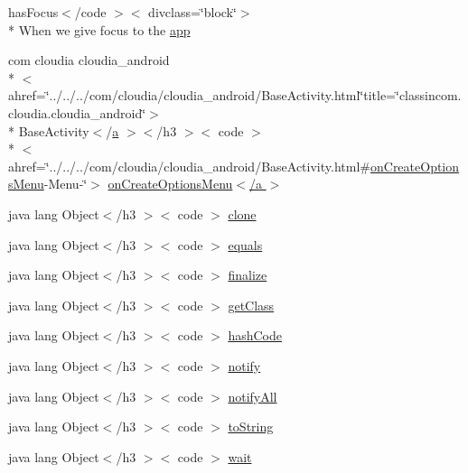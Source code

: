 \begin{DoxyCompactItemize}
\item 
has\-Focus$<$/code $>$$<$ divclass=\char`\"{}block\char`\"{}$>$\\*
 When we give focus to the \hyperlink{_cloudia_activity_8html_a788087bebea3161c6b9148d02d7652b0}{app}
\item 
com cloudia cloudia\-\_\-android\\*
$<$ ahref=\char`\"{}../../../com/cloudia/cloudia\-\_\-android/Base\-Activity.\-html\char`\"{}title=\char`\"{}classincom.\-cloudia.\-cloudia\-\_\-android\char`\"{}$>$\\*
 Base\-Activity$<$/\hyperlink{style_8css_a5e8981582017bb8b84c21f148345d1f7}{a} $>$$<$/h3 $>$$<$ code $>$\\*
$<$ ahref=\char`\"{}../../../com/cloudia/cloudia\-\_\-android/Base\-Activity.\-html\#\hyperlink{index-13_8html_a96b77eefe935dd33e8be2f1a26fcd2b6}{on\-Create\-Options\-Menu}-\/Menu-\/\char`\"{}$>$ \hyperlink{_cloudia_activity_8html_a624d351f7879c37d4dbd43acf019df6c}{on\-Create\-Options\-Menu$<$/a $>$}
\item 
java lang Object$<$/h3 $>$$<$ code $>$ \hyperlink{_cloudia_activity_8html_adc9607fcabf6f2d7f401ad52015ef6e0}{clone}
\item 
java lang Object$<$/h3 $>$$<$ code $>$ \hyperlink{_cloudia_activity_8html_a8974318cea585f72df717e0380ec7104}{equals}
\item 
java lang Object$<$/h3 $>$$<$ code $>$ \hyperlink{_cloudia_activity_8html_ab2315181ead4aeedef2374039b6ddde7}{finalize}
\item 
java lang Object$<$/h3 $>$$<$ code $>$ \hyperlink{_cloudia_activity_8html_a98e6644727fe65eac217a6855045be43}{get\-Class}
\item 
java lang Object$<$/h3 $>$$<$ code $>$ \hyperlink{_cloudia_activity_8html_a8e178e2bb2bef055ea23ea3910a221ca}{hash\-Code}
\item 
java lang Object$<$/h3 $>$$<$ code $>$ \hyperlink{_cloudia_activity_8html_ae99ae10b5010594dbda4794e02db271b}{notify}
\item 
java lang Object$<$/h3 $>$$<$ code $>$ \hyperlink{_cloudia_activity_8html_a1279357e6e09e33e75b55eb05fdb6436}{notify\-All}
\item 
java lang Object$<$/h3 $>$$<$ code $>$ \hyperlink{_cloudia_activity_8html_a36e8a76a4132c9a7081416f27d087615}{to\-String}
\item 
java lang Object$<$/h3 $>$$<$ code $>$ \hyperlink{_cloudia_activity_8html_a9a9f0c22e5688d478c707f910f1c1aea}{wait}
\end{DoxyCompactItemize}


